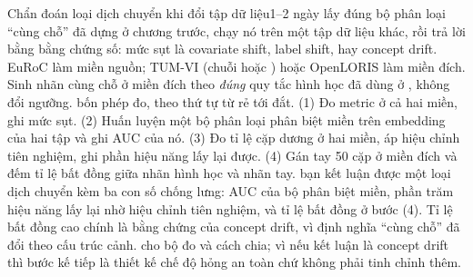 \documentclass[../../deep_learning.tex]{subfiles}
\begin{document}
\begin{duan}{Chẩn đoán loại dịch chuyển khi đổi tập dữ liệu}{1--2 ngày}
\dmt lấy đúng bộ phân loại ``cùng chỗ'' đã dựng ở chương trước, chạy nó trên một tập dữ liệu khác, rồi trả lời bằng bằng chứng số: mức sụt là covariate shift, label shift, hay concept drift.
\ddl EuRoC làm miền nguồn; TUM-VI (chuỗi  hoặc ) hoặc OpenLORIS làm miền đích. Sinh nhãn cùng chỗ ở miền đích theo \emph{đúng} quy tắc hình học đã dùng ở , không đổi ngưỡng.
\dbc bốn phép đo, theo thứ tự từ rẻ tới đắt. (1) Đo metric ở cả hai miền, ghi mức sụt. (2) Huấn luyện một bộ phân loại phân biệt miền trên embedding của hai tập và ghi AUC của nó. (3) Đo tỉ lệ cặp dương ở hai miền, áp hiệu chỉnh tiên nghiệm, ghi phần hiệu năng lấy lại được. (4) Gán tay 50 cặp ở miền đích và đếm tỉ lệ bất đồng giữa nhãn hình học và nhãn tay.
\dxk bạn kết luận được một loại dịch chuyển kèm ba con số chống lưng: AUC của bộ phân biệt miền, phần trăm hiệu năng lấy lại nhờ hiệu chỉnh tiên nghiệm, và tỉ lệ bất đồng ở bước (4). Tỉ lệ bất đồng cao chính là bằng chứng của concept drift, vì định nghĩa ``cùng chỗ'' đã đổi theo cấu trúc cảnh.
\dnv {} cho bộ đo và cách chia;  vì nếu kết luận là concept drift thì bước kế tiếp là thiết kế chế độ hỏng an toàn chứ không phải tinh chỉnh thêm.
\end{duan}

\begin{traloi}
\end{traloi}
\end{document}
